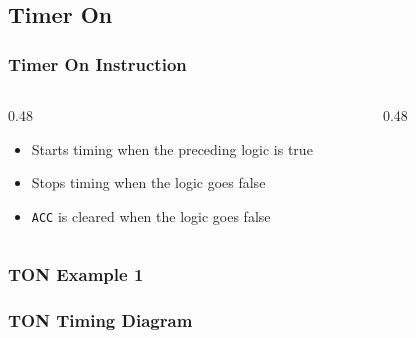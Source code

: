 \subsection{Timer On}

\begin{frame}
    \frametitle{Timer On Instruction}

    \begin{columns}
        \begin{column}{0.48\linewidth}
            \begin{itemize}
                \item Starts timing when the preceding logic is true
                \item Stops timing when the logic goes false
                \item \texttt{ACC} is cleared when the logic goes false
            \end{itemize}
        \end{column}
        \begin{column}{0.48\linewidth}
            \begin{figure}
                \centering
                
            \end{figure}
        \end{column}
    \end{columns}
\end{frame}

\begin{frame}
    \frametitle{TON Example 1}

    \begin{figure}
        \centering
        
    \end{figure}
\end{frame}

\begin{frame}
    \frametitle{TON Timing Diagram}

    \begin{figure}
        \centering
        \resizebox{0.875\linewidth}{!}{
            
        }
    \end{figure}    
\end{frame}

